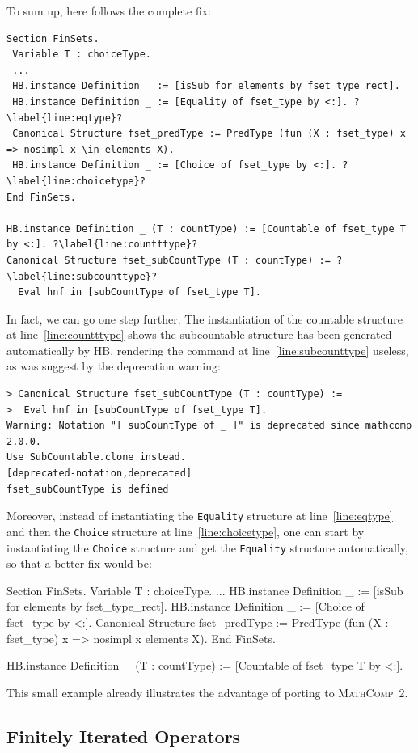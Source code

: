 \documentclass{article}
\def\mathcomp{\textsc{MathComp}}
\def\mathcomptwo{\mathcomp~2}
\def\hb{\textsc{HB}}
\def\coqin#1{\texttt{#1}}
\begin{document}
To sum up, here follows the complete fix:
\begin{verbatim}
Section FinSets.
 Variable T : choiceType.
 ...
 HB.instance Definition _ := [isSub for elements by fset_type_rect].
 HB.instance Definition _ := [Equality of fset_type by <:]. ?\label{line:eqtype}?
 Canonical Structure fset_predType := PredType (fun (X : fset_type) x => nosimpl x \in elements X).
 HB.instance Definition _ := [Choice of fset_type by <:]. ?\label{line:choicetype}?
End FinSets.

HB.instance Definition _ (T : countType) := [Countable of fset_type T by <:]. ?\label{line:countttype}?
Canonical Structure fset_subCountType (T : countType) := ?\label{line:subcounttype}?
  Eval hnf in [subCountType of fset_type T].
\end{verbatim}

In fact, we can go one step further. The instantiation of the
countable structure at line~\ref{line:countttype} shows the
subcountable structure has been generated automatically by \hb,
rendering the command at line~\ref{line:subcounttype} useless, as was
suggest by the deprecation warning:
\begin{verbatim}
> Canonical Structure fset_subCountType (T : countType) :=
>  Eval hnf in [subCountType of fset_type T].
Warning: Notation "[ subCountType of _ ]" is deprecated since mathcomp 2.0.0.
Use SubCountable.clone instead.
[deprecated-notation,deprecated]
fset_subCountType is defined
\end{verbatim}
Moreover, instead of instantiating the \coqin{Equality} structure at
line~\ref{line:eqtype} and then the \coqin{Choice} structure at
line~\ref{line:choicetype}, one can start by instantiating the
\coqin{Choice} structure and get the \coqin{Equality} structure
automatically, so that a better fix would be:
\begin{success}
Section FinSets.
 Variable T : choiceType.
 ...
 HB.instance Definition _ := [isSub for elements by fset_type_rect].
 HB.instance Definition _ := [Choice of fset_type by <:].
 Canonical Structure fset_predType := PredType (fun (X : fset_type) x => nosimpl x \in elements X).
End FinSets.

HB.instance Definition _ (T : countType) := [Countable of fset_type T by <:].
\end{success}
This small example already illustrates the advantage of porting to \mathcomptwo.

\subsection{Finitely Iterated Operators}
\end{document}
